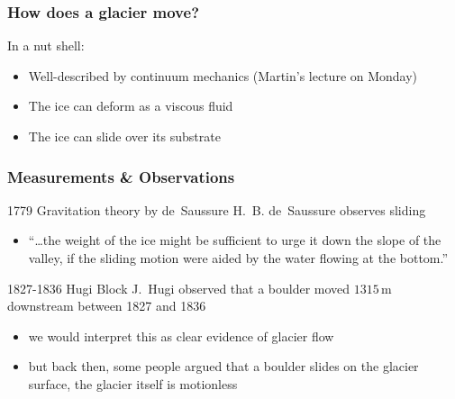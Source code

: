 \documentclass[hide notes,intlimits,unknownkeysallowed]{beamer}
\begin{document}
{
%
} 


\begin{frame}
  \frametitle{How does a glacier move?}
  \begin{block}{In a nut shell:}
    \begin{itemize}
    \item Well-described by continuum mechanics (Martin's lecture on Monday)
    \item The ice can deform as a viscous fluid
    \item The ice can slide over its substrate
    \end{itemize}
  \end{block}
\end{frame}


\begin{frame}
  \frametitle{Measurements \& Observations}
    \begin{block}{1779 Gravitation theory by de~Saussure}
      H.~B. de~Saussure observes sliding
      \begin{itemize}
        \item ``\ldots the weight of the ice might be sufficient to urge it down the slope of the valley, if the sliding motion were aided by the water flowing at the bottom.''
      \end{itemize}
    \end{block}
    \begin{block}{1827-1836 Hugi Block}
      J.~Hugi observed that a boulder moved $1315\,\text{m}$ downstream between 1827 and 1836
      \begin{itemize}
        \item we would interpret this as clear evidence of glacier flow
        \item but back then, some people argued that a boulder slides on the glacier surface, the glacier itself is motionless
      \end{itemize}
    \end{block}
\end{frame}
\end{document}
